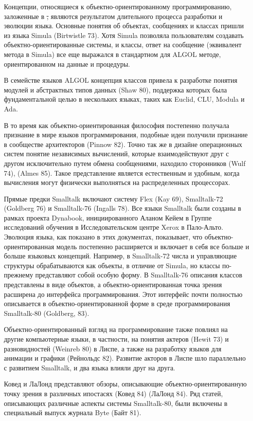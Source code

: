 
Концепции, относящиеся к объектно-ориентированному программированию, 
заложенные в \st, являются результатом длительного процесса 
разработки и эволюции языка. Основные понятия об объектах, сообщениях 
и классах пришли из языка Simula (Birtwistle 73). Хотя Simula 
позволяла пользователям создавать объектно-ориентированные системы, 
и классы, ответ на сообщение (эквивалент метода в Simula) все еще 
выражался в стандартном для ALGOL методе, ориентированном 
на данные и процедуры.

В семействе языков ALGOL концепция классов привела к разработке понятия 
модулей и абстрактных типов данных (Shaw 80), поддержка которых была 
фундаментальной целью в нескольких языках, таких как Euclid, CLU, Modula и Ada.

В то время как объектно-ориентированная философия постепенно получала признание 
в мире языков программирования, подобные идеи получили признание в сообществе 
архитекторов (Pinnow 82). Точно так же в дизайне операционных систем понятие 
независимых вычислений, которые взаимодействуют друг с другом исключительно 
путем обмена сообщениями, находило сторонников (Wulf 74), (Almes 85). Такое 
представление является естественным и удобным, когда вычисления могут 
физически выполняться на распределенных процессорах.

Прямые предки Smalltalk включают систему Flex (Kay 69), Smalltalk-72 (Goldberg 76) 
и Smalltalk-76 (Ingalls 78). Все языки Smalltalk были созданы в рамках 
проекта Dynabook, инициированного Аланом Кейем в Группе исследований 
обучения в Исследовательском центре Xerox в Пало-Альто. Эволюция языка, 
как показано в этих документах, показывает, что объектно-ориентированная 
модель постепенно расширяется и включает в себя все больше и больше языковых 
концепций. Например, в Smalltalk-72 числа и управляющие структуры обрабатываются 
как объекты, в отличие от Simula, но классы по-прежнему представляют собой 
особую форму. В Smalltalk-76 описания классов представлены в виде объектов, 
а объектно-ориентированная точка зрения расширена до интерфейса программирования. 
Этот интерфейс почти полностью описывается в объектно-ориентиро\-ван\-ной форме 
в среде программирования Smalltalk-80 (Goldberg, 83).

Объектно-ориентированный взгляд на программирование также повлиял на 
другие компьютерные языки, в частности, на понятия актеров (Hewit 73) и 
разновидностей (Weinreb 80) в Лиспе, а также на разработку языков для 
анимации и графики (Рейнольдс 82). Развитие акторов в Лиспе шло параллельно 
с развитием Smalltalk, и два языка влияли друг на друга.

Ковед и ЛаЛонд представляют обзоры, описывающие объектно-ориентированную 
точку зрения в различных ипостасях (Ковед 84) (ЛаЛонд 84). Ряд статей, 
описывающих различные аспекты системы Smalltalk-80, были включены в 
специальный выпуск журнала Byte (Байт 81).
